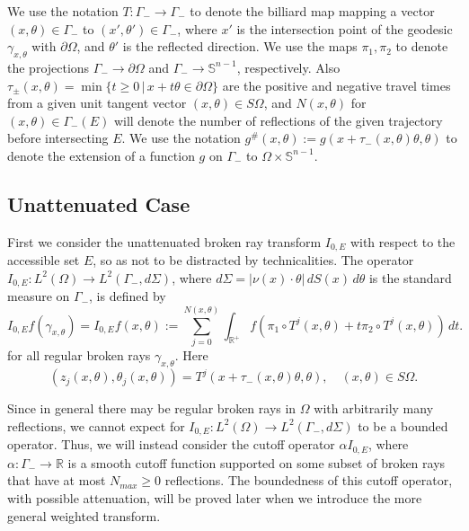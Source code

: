 \documentclass[10pt]{amsart}
\theoremstyle{definition}
\theoremstyle{definition}
\theoremstyle{definition}
\newcommand{ \rn }[1]{\mathbb{R}^{#1}}
\begin{document}
We use the notation $T:\Gamma_{-} \to \Gamma_{-}$ to denote the billiard map mapping a vector $(x,\theta) \in \Gamma_{-}$ to $(x',\theta') \in \Gamma_{-}$, where $x'$ is the intersection point of the geodesic $\gamma_{x,\theta}$ with $\partial \Omega$, and $\theta'$ is the reflected direction. We use the maps $\pi_{1},\pi_{2}$ to denote the projections $\Gamma_{-} \to \partial \Omega$ and $\Gamma_{-} \to \mathbb{S}^{n-1}$, respectively. Also $\tau_{\pm}(x,\theta) = \min \{ t \geq 0 \, | \, x + t\theta \in \partial \Omega\}$ are the positive and negative travel times from a given unit tangent vector $(x,\theta) \in S\Omega$, and $N(x,\theta)$ for $(x,\theta) \in \Gamma_{-}(E)$ will denote the number of reflections of the given trajectory before intersecting $E$. We use the notation $g^{\#}(x,\theta) := g(x + \tau_{-}(x,\theta)\theta, \theta)$ to denote the extension of a function $g$ on $\Gamma_{-}$ to $\Omega \times \mathbb{S}^{n-1}$. 

\subsection{Unattenuated Case}
First we consider the unattenuated broken ray transform $I_{0,E}$ with respect to the accessible set $E$, so as not to be distracted by technicalities. The operator $I_{0,E}:L^{2}(\Omega) \to L^{2}(\Gamma_{-}, d\Sigma)$, where $d\Sigma = |\nu(x) \cdot \theta|\, dS(x)\, d\theta$ is the standard measure on $\Gamma_{-}$, is defined by
\begin{equation}
I_{0, E}f(\gamma_{x,\theta}) = I_{0, E}f(x,\theta) := \sum_{j=0}^{N(x,\theta)}\int_{\rn{+}} f(\pi_{1} \circ T^{j}(x,\theta) + t \pi_{2}\circ T^{j}(x,\theta))\,dt. \label{forwardoperator}
\end{equation}
for all regular broken rays $\gamma_{x,\theta}$. Here 
\begin{equation}
(z_{j}(x,\theta),\theta_{j}(x,\theta)) = T^{j}(x+\tau_{-}(x,\theta)\theta,\theta), \quad (x,\theta) \in S\Omega. \label{eq:zjthetaj}
\end{equation}

Since in general there may be regular broken rays in $\Omega$ with arbitrarily many reflections, we cannot expect for $I_{0,E}:L^{2}(\Omega) \to L^{2}(\Gamma_{-}, d\Sigma)$ to be a bounded operator. Thus, we will instead consider the cutoff operator $\alpha I_{0, E}$, where $\alpha:\Gamma_{-}\to \mathbb{R}$ is a smooth cutoff function supported on some subset of broken rays that have at most $N_{max} \geq 0$ reflections. The boundedness of this cutoff operator, with possible attenuation, will be proved later when we introduce the more general weighted transform.
\end{document}
